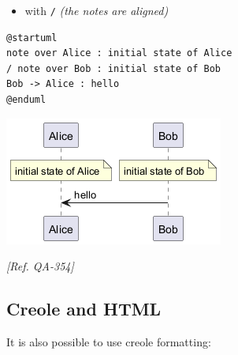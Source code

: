 \begin{itemize}
\item with \texttt{/} \textit{(the notes are aligned)}
\end{itemize}
\begin{verbatim}
@startuml
note over Alice : initial state of Alice
/ note over Bob : initial state of Bob
Bob -> Alice : hello
@enduml
\end{verbatim}
\begin{center}
\includegraphics[scale=0.60]{imgw/img-a5567ee92f01756037e83c2b6fe4c8e1.png}
\end{center}


\textit{[Ref. QA-354]}
%
%
\subsection{Creole and HTML}


It is also possible to use creole formatting:


